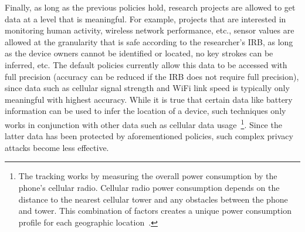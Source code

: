 Finally, as long as the previous policies hold, research 
projects are allowed to get data at a level that is meaningful. For example, 
projects that are interested in monitoring human activity, wireless network 
performance, etc., sensor values are allowed at the granularity that is safe 
according to the researcher's IRB, 
as long as the device owners cannot be identified or located, no key strokes 
can be inferred, etc. The default policies currently allow this data to be 
accessed with full precision (accuracy can be reduced if the IRB
does not require full precision), since data such as cellular signal strength and WiFi 
link speed is typically only meaningful with highest accuracy. While it is true that
certain data like battery information can be used to infer the location of 
a device, such techniques only works in conjunction with other data 
such as cellular data usage~\cite{michalevsky2015powerspy}\footnote{\scriptsize 
The tracking works by measuring the overall power consumption 
by the phone's cellular radio. Cellular radio power consumption depends 
on the distance to the nearest cellular tower and any obstacles between 
the phone and tower. This combination of factors creates a unique power 
consumption profile for each geographic location~\cite{battery-use}.}. 
Since the latter data has been protected by aforementioned policies, such 
complex privacy attacks become less effective. 

